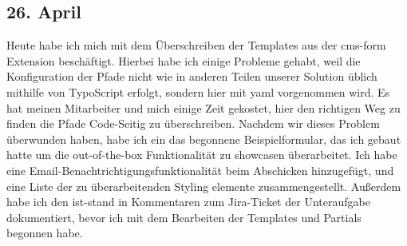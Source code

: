 \subsection{26. April}
Heute habe ich mich mit dem Überschreiben der Templates aus der cms-form Extension beschäftigt. Hierbei habe ich einige Probleme gehabt, weil die Konfiguration der Pfade nicht wie in anderen Teilen unserer Solution üblich mithilfe von TypoScript erfolgt, sondern hier mit yaml vorgenommen wird. Es hat meinen Mitarbeiter und mich einige Zeit gekostet, hier den richtigen Weg zu finden die Pfade Code-Seitig zu überschreiben. Nachdem wir dieses Problem überwunden haben, habe ich ein das begonnene Beispielformular, das ich gebaut hatte um die out-of-the-box Funktionalität zu showcasen überarbeitet. Ich habe eine Email-Benachtrichtigungsfunktionalität beim Abschicken hinzugefügt, und eine Liste der zu überarbeitenden Styling elemente zusammengestellt. Außerdem habe ich den ist-stand in Kommentaren zum Jira-Ticket der Unteraufgabe dokumentiert, bevor ich mit dem Bearbeiten der Templates und Partials begonnen habe.